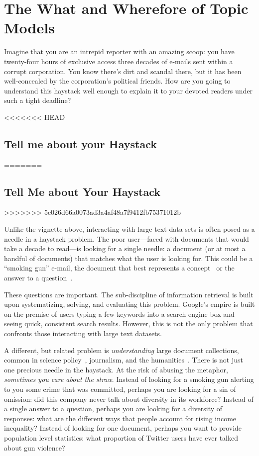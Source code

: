 
\chapter{The What and Wherefore of Topic Models}
\label{ch:intro}

Imagine that you are an intrepid reporter with an amazing scoop: you have
twenty-four hours of exclusive access three decades of e-mails sent within a
corrupt corporation.  You know there's dirt and scandal there, but it has been
well-concealed by the corporation's political friends.  How are you going to
understand this haystack well enough to explain it to your devoted readers under
such a tight deadline?

<<<<<<< HEAD
\section{Tell me about your Haystack}
=======
\section{Tell Me about Your Haystack}
>>>>>>> 5c026d66a0073ad3a4af48a7f9412fb75371012b

Unlike the vignette above, interacting with large text data sets is often posed
as a needle in a haystack problem.  The poor user---faced with documents that
would take a decade to read---is looking for a single needle: a document (or at
most a handful of documents) that matches what the user is looking for.  This
could be a ``smoking gun'' e-mail, the document that best represents a
concept~\citep{Salton-68} or the answer to a question~\citep{Hirschman-01}.

These questions are important.  The sub-discipline of information retrieval is
built upon systematizing, solving, and evaluating this problem.  Google's empire
is built on the premise of users typing a few keywords into a search engine box
and seeing quick, consistent search results.  However, this is not the only
problem that confronts those interacting with large text datasets.

A different, but related problem is \emph{understanding} large document
collections, common in science policy~\citep{talley-11}, journalism, and the
humanities~\citep{moretti-13}.  There is not just one precious needle in
the haystack.  At the risk of abusing the metaphor, \emph{sometimes you care
  about the straw}.  Instead of looking for a smoking gun alerting to you some
crime that was committed, perhaps you are looking for a sin of
omission: did this company never talk about diversity in its workforce?
Instead of a single answer to a question, perhaps you are looking for a diversity
of responses: what are the different ways that people account for rising income
inequality?  Instead of looking for one document, perhaps you want to provide
population level statistics: what proportion of Twitter users have ever talked
about gun violence?

